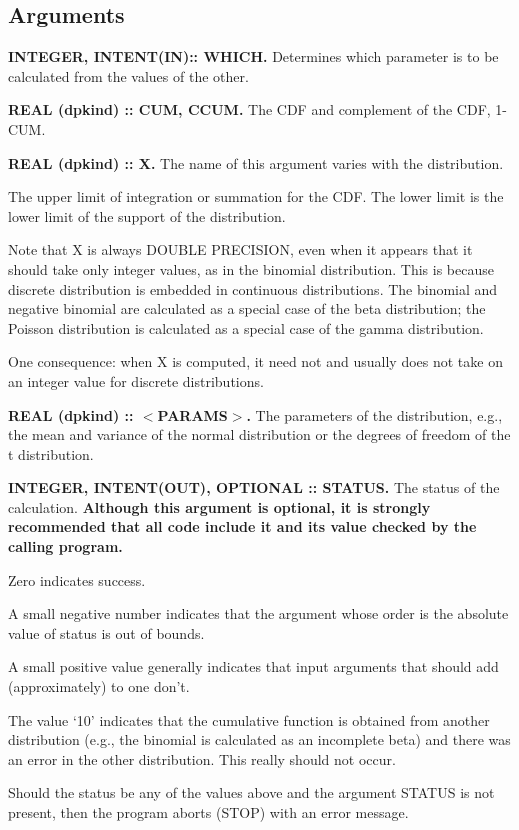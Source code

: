 \documentclass[12pt,dvips]{article}
\newcommand{\meta}[1]{{\ensuremath{<}}#1{\ensuremath{{>}}}}
\newcommand{\mysubsection}[1] {\color{green}
             \subsection{#1} \normalcolor}
\newcommand{\myitem}[1]{\item{\bf \color{Violet} #1 \normalcolor}}
\begin{document}
\mysubsection{Arguments}

\begin{description}

\myitem{INTEGER, INTENT(IN):: WHICH.} Determines which parameter is to be
calculated from the values of the other.

\myitem{REAL (dpkind) :: CUM, CCUM.} The CDF and complement of the CDF,
1-CUM.

\myitem{REAL (dpkind) :: X.} The name of this argument varies with
the distribution.

The upper  limit of integration or  summation for the  CDF.  The lower
limit is the lower limit of the support of the distribution.

Note that X  is always DOUBLE PRECISION, even when  it appears that it
should  take only  integer values,  as in  the  binomial distribution.
This  is  because  discrete  distribution is  embedded  in  continuous
distributions.  The binomial and negative binomial are calculated as a
special  case of the  beta distribution;  the Poisson  distribution is
calculated as a special case of the gamma distribution.

One consequence: when X is computed,  it need not and usually does not
take on an integer value for discrete distributions.

\myitem{REAL  (dpkind)   ::  \meta{PARAMS}.}   The   parameters  of  the
distribution, e.g.,  the mean and variance of  the normal distribution
or the degrees of freedom of the t distribution.

\myitem{INTEGER, INTENT(OUT), OPTIONAL ::  STATUS.}  The status of the
calculation.  {\bf Although this  argument is optional, it is strongly
  recommended that  all code include it  and its value  checked by the
  calling program.}

Zero indicates  success.  

A small negative number indicates that the argument whose order is the
absolute value of status is out of bounds.

A small  positive value generally indicates that  input arguments that
should add (approximately) to one don't.

The value `10' indicates that the cumulative function is obtained from
another  distribution   (e.g.,  the  binomial  is   calculated  as  an
incomplete beta)  and there  was an error  in the other  distribution. 
This really should not occur.

Should the status  be any of the values above  and the argument STATUS
is not present, then the program aborts (STOP) with an error message.


\end{description}
\end{document}
